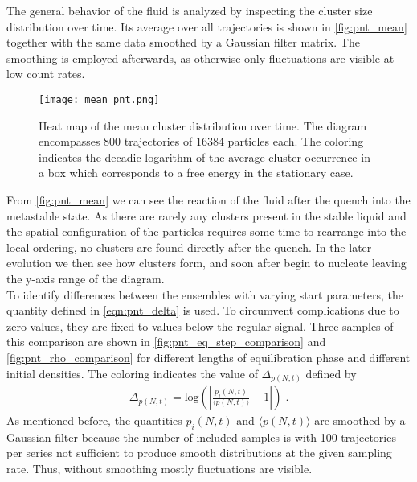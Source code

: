 The general behavior of the fluid is analyzed by inspecting the cluster size distribution over time. Its average over all trajectories is shown in \autoref{fig:pnt_mean} together with the same data smoothed by a Gaussian filter matrix. The smoothing is employed afterwards, as otherwise only fluctuations are visible at low count rates.\\

\begin{figure}[h!]
\centering
\texttt{[image: mean\_pnt.png]}
\caption[Gaussian filter applied to cluster size distribution]{Heat map of the mean cluster distribution over time. The diagram encompasses 800 trajectories of 16384 particles each. The coloring indicates the decadic logarithm of the average cluster occurrence in a box which corresponds to a free energy in the stationary case.}
\label{fig:pnt_mean}
\end{figure}

From \autoref{fig:pnt_mean} we can see the reaction of the fluid after the quench into the metastable state. As there are rarely any clusters present in the stable liquid and the spatial configuration of the particles requires some time to rearrange into the local ordering, no clusters are found directly after the quench. In the later evolution we then see how clusters form, and soon after begin to nucleate leaving the y-axis range of the diagram.\\

To identify differences between the ensembles with varying start parameters, the quantity defined in \autoref{eqn:pnt_delta} is used. To circumvent complications due to zero values, they are fixed to values below the regular signal. Three samples of this comparison are shown in \autoref{fig:pnt_eq_step_comparison} and \autoref{fig:pnt_rho_comparison} for different lengths of equilibration phase and different initial densities. The coloring indicates the value of $\Delta_{p(N,t)}$ defined by
\begin{align}
\label{eqn:pnt_delta}
\Delta_{p(N,t)} = \text{log} \left( \left| \frac{p_i(N,t)}{\langle p(N,t) \rangle} -1 \right| \right) \; \text{.}
\end{align}
As mentioned before, the quantities $p_i(N,t)$ and $\langle p(N,t) \rangle$ are smoothed by a Gaussian filter because the number of included samples is with 100 trajectories per series not sufficient to produce smooth distributions at the given sampling rate. Thus, without smoothing mostly fluctuations are visible.


